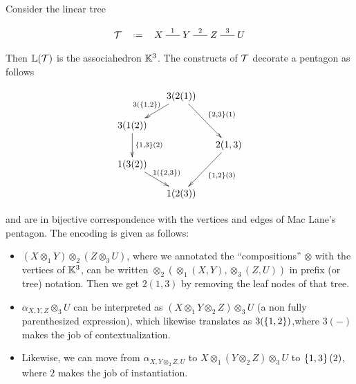 \begin{example}
Consider the linear tree
\vspace{-.7cm}
\begin{center}
$$\xymatrix @-1.65pc {{\cal T} & \eqdef  &X \ar @{-}[rr]^{1}&& Y \ar @{-}[rr]^{2}&& Z \ar @{-}[rr]^{3}&& U}
  $$
\end{center}
Then ${\mathbb L}({\cal T})$ is the associahedron ${\mathbb K}^3$. 
The constructs of ${\cal T}$ decorate a pentagon as follows
\begin{center}
$$\xymatrix @-1.65pc {&& 3(2(1)) \ar @{->}[ddll]_{3(\set{1,2})} \ar @{->}[dddrr]^{\set{2,3}(1)}&& \\
 &&&&\\
3(1(2))   \ar @{->}[dd]^{\set{1,3}(2)}&&   && \\
 &&&&2(1,3) \ar @{->}[dddll]^{\set{1,2}(3)}\\
 1(3(2)) \ar @{->}[ddrr]^{1(\set{2,3})} &  &\\
 &&&&\\
 &&1(2(3))&&}$$
\end{center}
and are in bijective correspondence with the vertices and edges of Mac Lane's pentagon. 
The encoding is given as follows:
  \begin{itemize}
  \item $(X\otimes_1 Y)\otimes_2 (Z\otimes_3 U)$, where we annotated the ``compositions'' $\otimes$ with the vertices of ${\mathbb K}^3$, can be written $\otimes_2(\otimes_1(X,Y),\otimes_3(Z,U))$ in prefix (or tree) notation. Then we get 
 $2(1,3)$ by removing the leaf nodes of that tree.
 \item $\alpha_{X,Y,Z}\otimes_3 U$ can be interpreted as $(X\otimes_1 Y\otimes_2 Z)\otimes_3 U$ (a non fully parenthesized expression), which likewise 
 translates as $3(\left\{1,2\right\})$,where $3(-)$ makes the job of contextualization.
 \item Likewise, we can move from
$\alpha_{X,Y\otimes_2 Z,U}$ to $X\otimes_1(Y\otimes_2 Z)\otimes_3 U$ to $\left\{1,3\right\}(2)$, where $2$ makes the job of instantiation.
\end{itemize}
\end{example}

